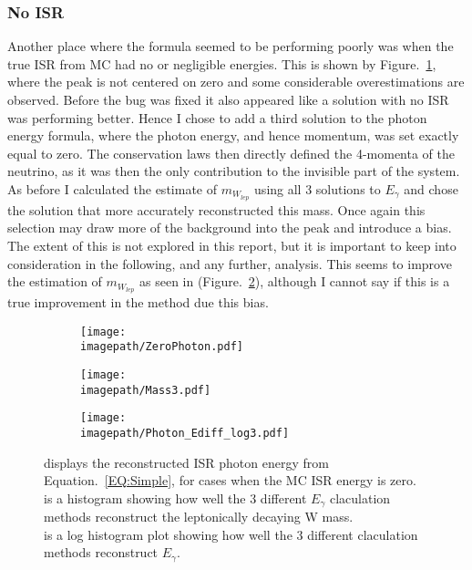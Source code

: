 \subsubsection{No ISR}
\label{SUBSUBSEC:NoISR}
Another place where the formula seemed to be performing poorly was when the true ISR from MC had no or negligible energies. This is shown by Figure.~\ref{SUBFIG:ZeroPhoton}, where the peak is not centered on zero and some considerable overestimations are observed. Before the bug was fixed it also appeared like a solution with no ISR was performing better. Hence I chose to add a third solution to the photon energy formula, where the photon energy, and hence momentum, was set exactly equal to zero. The conservation laws then directly defined the 4-momenta of the neutrino, as it was then the only contribution to the invisible part of the system. As before I calculated the estimate of ${m}_{W_{lep}}$ using all 3 solutions to $E_{\gamma}$ and chose the solution that more accurately reconstructed this mass. Once again this selection may draw more of the background into the peak and introduce a bias. The extent of this is not explored in this report, but it is important to keep into consideration in the following, and any further, analysis. This seems to improve the estimation of ${m}_{W_{lep}}$ as seen in (Figure.~\ref{SUBFIG:Mass3}), although I cannot say if this is a true improvement in the method due this bias.
\begin{figure}
    \begin{subfigure}[t]{0.32\textwidth}
      \centering
      \texttt{[image: \\imagepath/ZeroPhoton.pdf]}
      \caption{}
      \label{SUBFIG:ZeroPhoton}
    \end{subfigure}
    \begin{subfigure}[t]{0.32\textwidth}
      \centering
      \texttt{[image: \\imagepath/Mass3.pdf]}
      \caption{}
      \label{SUBFIG:Mass3}
    \end{subfigure}
    \begin{subfigure}[t]{0.32\textwidth}
      \centering
      \texttt{[image: \\imagepath/Photon\_Ediff\_log3.pdf]}
      \caption{}
      \label{SUBFIG:Ediff}
    \end{subfigure}
    \caption{
     displays the reconstructed ISR photon energy from Equation.~\ref{EQ:Simple}, for cases when the MC ISR energy is zero.\\
     is a histogram showing how well the 3 different ${E}_{\gamma}$ claculation methods reconstruct the leptonically decaying W mass.\\
     is a log histogram plot showing how well the 3 different claculation methods reconstruct ${E}_{\gamma}$.
     }
    \label{FIG:ZeroPhoton}
\end{figure}

